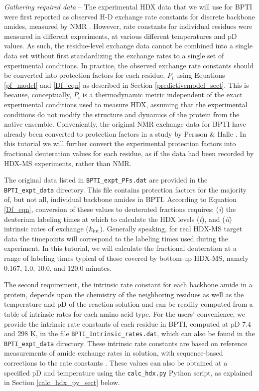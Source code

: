 \documentclass[9pt,tutorial,ASAPversion]{livecoms}
\begin{document}
\textit{Gathering required data} -- The experimental HDX data that we will use for BPTI were first reported as observed H-D exchange rate constants for discrete backbone amides, measured by NMR \cite{Kim1993, Battiste2002}. 
However, rate constants for individual residues were measured in different experiments, at various different temperatures and pD values.
As such, the residue-level exchange data cannot be combined into a single data set without first standardizing the exchange rates to a single set of experimental conditions.
In practice, the observed exchange rate constants should be converted into protection factors for each residue, $P_i$ using Equations \ref{pf_model} and \ref{Df_eqn} as described in Section \ref{predictivemodel_sect}.
This is because, conceptually, $P_i$ is a thermodynamic metric independent of the exact experimental conditions used to measure HDX, assuming that the experimental conditions do not modify the structure and dynamics of the protein from the native ensemble.
Conveniently, the original NMR exchange data for BPTI have already been converted to protection factors in a study by Persson \& Halle \cite{Persson2015}.
In this tutorial we will further convert the experimental protection factors into fractional deuteration values for each residue, as if the data had been recorded by HDX-MS experiments, rather than NMR. 

The original data listed in \texttt{BPTI\_expt\_PFs.dat} are provided in the \texttt{BPTI\_expt\_data} directory.
This file contains protection factors for the majority of, but not all, individual backbone amides in BPTI.
According to Equation \ref{Df_eqn}, conversion of these values to deuterated fractions requires: (\textit{i}) the deuterium labeling times at which to calculate the HDX levels (\textit{t}), and (\textit{ii}) intrinsic rates of exchange ($k_\textnormal{int}$).
Generally speaking, for real HDX-MS target data the timepoints will correspond to the labeling times used during the experiment.
In this tutorial, we will calculate the fractional deuteration at a range of labeling times typical of those covered by bottom-up HDX-MS, namely 0.167, 1.0, 10.0, and 120.0 minutes. 

The second requirement, the intrinsic rate constant for each backbone amide in a protein, depends upon the chemistry of the neighboring residues as well as the temperature and pD of the reaction solution and can be readily computed from a table of intrinsic rates for each amino acid type.
For the users' convenience, we provide the intrinsic rate constants of each residue in BPTI, computed at pD 7.4 and 298 K, in the file \texttt{BPTI\_Intrinsic\_rates.dat}, which can also be found in the \texttt{BPTI\_expt\_data} directory.
These intrinsic rate constants are based on reference measurements of amide exchange rates in solution, with sequence-based corrections to the rate constants \cite{Bai1993, Nguyen2018}.
These values can also be obtained at a specified pD and temperature using the \texttt{calc\_hdx.py} Python script, as explained in Section \ref{calc_hdx_py_sect} below.
\end{document}
